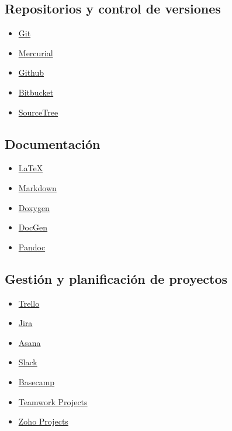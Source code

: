 \subsection{Repositorios y control de versiones}
\begin{multicols}{2}
\begin{itemize}[nosep]
\item \href{https://git-scm.com/}{Git}
\item \href{https://www.mercurial-scm.org/}{Mercurial}
\item \href{https://github.com/}{Github}
\item \href{https://bitbucket.org/}{Bitbucket}
\item \href{https://www.sourcetreeapp.com/}{SourceTree}
\end{itemize}
\end{multicols}


\subsection{Documentación}
\begin{multicols}{2}
\begin{itemize}[nosep]
\item \href{https://www.latex-project.org/}{\LaTeX}
\item \href{https://markdown.es/}{Markdown}
\item \href{http://www.stack.nl/\%7Edimitri/doxygen/index.html}{Doxygen}
\item \href{http://mtmacdonald.github.io/docgen/docs/index.html}{DocGen}
\item \href{http://pandoc.org/}{Pandoc}
\end{itemize}
\end{multicols}



\subsection{Gestión y planificación de proyectos}
\begin{multicols}{2}
\begin{itemize}[nosep]
\item \href{https://trello.com/}{Trello}
\item \href{https://es.atlassian.com/software/jira}{Jira}
\item \href{https://asana.com/}{Asana}
\item \href{https://slack.com/}{Slack}
\item \href{https://basecamp.com/}{Basecamp}
\item \href{https://www.teamwork.com/project-management-software}{Teamwork Projects}
\item \href{https://www.zoho.com/projects/}{Zoho Projects}
\end{itemize}
\end{multicols}

